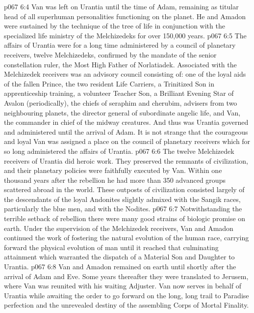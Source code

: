 \vs p067 6:4 Van was left on Urantia until the time of Adam, remaining as titular head of all superhuman personalities functioning on the planet. He and Amadon were sustained by the technique of the tree of life in conjunction with the specialized life ministry of the Melchizedeks for over 150,000 years.
\vs p067 6:5 \pc The affairs of Urantia were for a long time administered by a council of planetary receivers, twelve Melchizedeks, confirmed by the mandate of the senior constellation ruler, the Most High Father of Norlatiadek. Associated with the Melchizedek receivers was an advisory council consisting of: one of the loyal aids of the fallen Prince, the two resident Life Carriers, a Trinitized Son in apprenticeship training, a volunteer Teacher Son, a Brilliant Evening Star of Avalon (periodically), the chiefs of seraphim and cherubim, advisers from two neighbouring planets, the director general of subordinate angelic life, and Van, the commander in chief of the midway creatures. And thus was Urantia governed and administered until the arrival of Adam. It is not strange that the courageous and loyal Van was assigned a place on the council of planetary receivers which for so long administered the affairs of Urantia.
\vs p067 6:6 The twelve Melchizedek receivers of Urantia did heroic work. They preserved the remnants of civilization, and their planetary policies were faithfully executed by Van. Within one thousand years after the rebellion he had more than 350 advanced groups scattered abroad in the world. These outposts of civilization consisted largely of the descendants of the loyal Andonites slightly admixed with the Sangik races, particularly the blue men, and with the Nodites.
\vs p067 6:7 Notwithstanding the terrible setback of rebellion there were many good strains of biologic promise on earth. Under the supervision of the Melchizedek receivers, Van and Amadon continued the work of fostering the natural evolution of the human race, carrying forward the physical evolution of man until it reached that culminating attainment which warranted the dispatch of a Material Son and Daughter to Urantia.
\vs p067 6:8 \pc Van and Amadon remained on earth until shortly after the arrival of Adam and Eve. Some years thereafter they were translated to Jerusem, where Van was reunited with his waiting Adjuster. Van now serves in behalf of Urantia while awaiting the order to go forward on the long, long trail to Paradise perfection and the unrevealed destiny of the assembling Corps of Mortal Finality.
